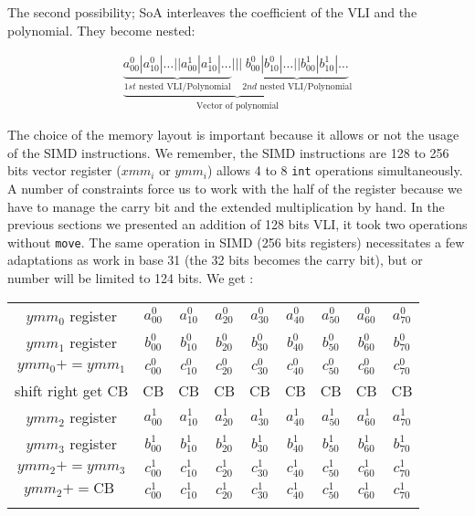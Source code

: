 \documentclass[11pt]{amsart}
\begin{document}
The second possibility; SoA interleaves the coefficient of the VLI and the polynomial. They become nested:

\begin{eqnarray}
 \underbrace{
 \underbrace{a^0_{00} | a^0_{10} | \dots || a^1_{00} | a^1_{10} | \dots  }_{1st  \textrm{ nested VLI/Polynomial} } |||  \underbrace{b^0_{00} | b^0_{10} | \dots || b^1_{00} | b^1_{10} | \dots  }_{2nd  \textrm{ nested VLI/Polynomial} }
 }_{\textrm{Vector of polynomial}} \nonumber
\end{eqnarray}

The choice of the memory layout is important because it allows or not the usage of the SIMD instructions. We remember,  the SIMD instructions are 128 to 256 bits vector register ($xmm_i$ or $ymm_i$) allows 4 to 8 \texttt{int}  operations simultaneously.
A number of constraints force us to work with the half of the register because we have to manage the carry bit and the extended multiplication by hand. In the previous sections we presented an addition of 128 bits VLI, it took two operations
without \texttt{move}.   The same operation in SIMD (256 bits registers) necessitates a few adaptations as work in base 31 (the 32 bits becomes the carry bit), but or number will be limited to 124 bits. We get :    

\begin{center}
\begin{tabular}{ c  c c c c c c c c} 
\\
 $ymm_0$   register      &    $a^0_{00}$  & $a^0_{10}$ & $a^0_{20}$  &  $a^0_{30}$ & $a^0_{40}$  &   $a^0_{50}$ &  $a^0_{60}$   & $a^0_{70}$  \\
 $ymm_1$   register      &    $b^0_{00}$  & $b^0_{10}$ & $b^0_{20}$  &  $b^0_{30}$ & $b^0_{40}$  &   $b^0_{50}$ &  $b^0_{60}$   & $b^0_{70}$  \\
$ymm_0 += ymm_1$    &    $c^0_{00}$  & $c^0_{10}$ & $c^0_{20}$  &  $c^0_{30}$  & $c^0_{40}$  &   $c^0_{50}$  &  $c^0_{60}$   & $c^0_{70}$  \\
shift right  get CB        &     CB                 & CB                & CB                 & CB                   & CB               &  CB                   & CB                   & CB \\
$ymm_2$   register      &    $a^1_{00}$  & $a^1_{10}$ & $a^1_{20}$  &  $a^1_{30}$ & $a^1_{40}$  &   $a^1_{50}$ &  $a^1_{60}$   & $a^1_{70}$  \\
 $ymm_3$   register      &    $b^1_{00}$  & $b^1_{10}$ & $b^1_{20}$  &  $b^1_{30}$ & $b^1_{40}$  &   $b^1_{50}$ &  $b^1_{60}$   & $b^1_{70}$  \\
$ymm_2 += ymm_3$     & $c^1_{00}$  & $c^1_{10}$ & $c^1_{20}$  &  $c^1_{30}$  & $c^1_{40}$  &   $c^1_{50}$  &  $c^1_{60}$   & $c^1_{70}$  \\                            
$ymm_2 +=  \textrm{CB } $ & $c^1_{00}$  & $c^1_{10}$ & $c^1_{20}$  &  $c^1_{30}$  & $c^1_{40}$  &   $c^1_{50}$  &  $c^1_{60}$   & $c^1_{70}$  \\                            
\\
\end{tabular}
\end{center}
\end{document}
